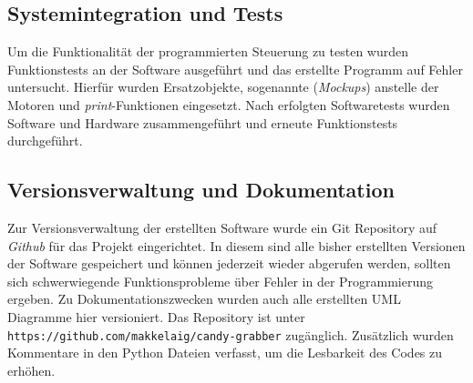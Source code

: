 \documentclass[BMR,Bachelor,ngerman]{twbook}%
\begin{document}
\subsection{Systemintegration und Tests}
Um die Funktionalität der programmierten Steuerung zu testen wurden Funktionstests an der Software ausgeführt und das erstellte Programm auf Fehler untersucht. Hierfür wurden Ersatzobjekte, sogenannte (\emph{Mockups}) anstelle der Motoren und \emph{print}-Funktionen eingesetzt. Nach erfolgten Softwaretests wurden Software und Hardware zusammengeführt und erneute Funktionstests durchgeführt.
\subsection{Versionsverwaltung und Dokumentation}
Zur Versionsverwaltung der erstellten Software wurde ein Git Repository auf \emph{Github} für das Projekt eingerichtet. In diesem sind alle bisher erstellten Versionen der Software gespeichert und können jederzeit wieder abgerufen werden, sollten sich schwerwiegende Funktionsprobleme über Fehler in der Programmierung ergeben. Zu Dokumentationszwecken wurden auch alle erstellten \ac{UML} Diagramme hier versioniert. Das Repository ist unter \verb+https://github.com/makkelaig/candy-grabber+ zugänglich. Zusätzlich wurden Kommentare in den Python Dateien verfasst, um die Lesbarkeit des Codes zu erhöhen.
%
\clearpage
\end{document}
